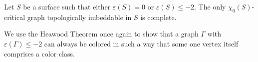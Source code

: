 Let $S$ be a surface such that either $\varepsilon(S) = 0$ or $\varepsilon(S) \leq -2$. The only $\chi_0(S)$-critical graph topologically imbeddable in $S$ is complete.

We use the Heawood Theorem once again to show that a graph $\Gamma$ with $\varepsilon(\Gamma) \leq -2$ can always be colored in such a way that some one vertex itself comprises a color class.
